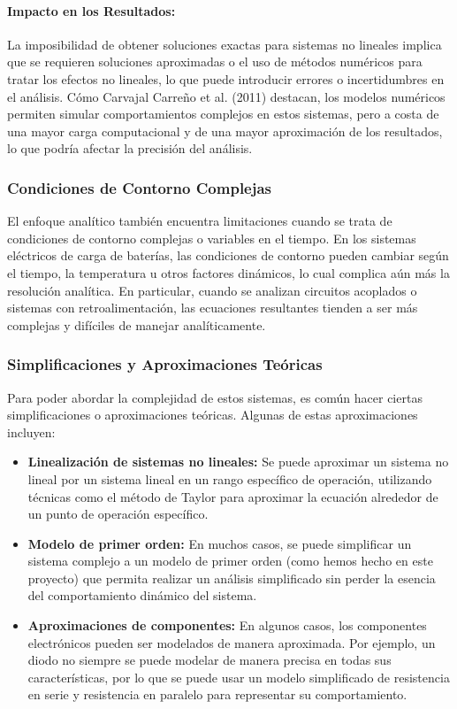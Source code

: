 \paragraph*{Impacto en los Resultados:}
La imposibilidad de obtener soluciones exactas para sistemas no lineales implica que
se requieren soluciones aproximadas o el uso de métodos numéricos para tratar los
efectos no lineales, lo que puede introducir errores o incertidumbres en el análisis.
Cómo Carvajal Carreño et al. (2011) destacan, los modelos numéricos permiten
simular comportamientos complejos en estos sistemas, pero a costa de una mayor
carga computacional y de una mayor aproximación de los resultados, lo que podría
afectar la precisión del análisis.

\subsubsection*{Condiciones de Contorno Complejas}
El enfoque analítico también encuentra limitaciones cuando se trata de condiciones de
contorno complejas o variables en el tiempo. En los sistemas eléctricos de carga de baterías,
las condiciones de contorno pueden cambiar según el tiempo, la temperatura u otros factores
dinámicos, lo cual complica aún más la resolución analítica. En particular, cuando se analizan
circuitos acoplados o sistemas con retroalimentación, las ecuaciones resultantes tienden a ser
más complejas y difíciles de manejar analíticamente.

\subsubsection*{Simplificaciones y Aproximaciones Teóricas}
Para poder abordar la complejidad de estos sistemas, es común hacer ciertas simplificaciones
o aproximaciones teóricas. Algunas de estas aproximaciones incluyen:

\begin{itemize}
	\item \textbf{Linealización de sistemas no lineales:} Se puede aproximar un sistema no lineal por un sistema lineal en un rango específico de operación, utilizando técnicas como el método de Taylor para aproximar la ecuación alrededor de un punto de operación específico.

	\item \textbf{Modelo de primer orden:} En muchos casos, se puede simplificar un sistema complejo a un modelo de primer orden (como hemos hecho en este proyecto) que permita realizar un análisis simplificado sin perder la esencia del comportamiento dinámico del sistema.

	\item \textbf{Aproximaciones de componentes:} En algunos casos, los componentes electrónicos pueden ser modelados de manera aproximada. Por ejemplo, un diodo no siempre se puede modelar de manera precisa en todas sus características, por lo que se puede usar un modelo simplificado de resistencia en serie y resistencia en paralelo para representar su comportamiento.
\end{itemize}

